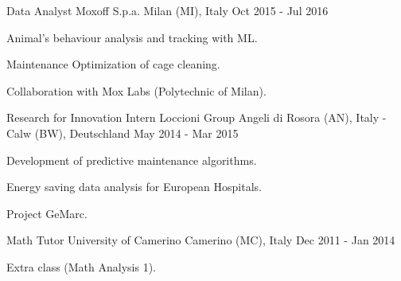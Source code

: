 \begin{cventries}
 \cventry
    {Data Analyst} %
    {Moxoff S.p.a.} %
    {Milan (MI), Italy} %
    {Oct 2015 - Jul 2016} %
    {
     \begin{cvitems} %
        \item {Animal's behaviour analysis and tracking with ML.}
        \item {Maintenance Optimization of cage cleaning.}
        \item {Collaboration with Mox Labs (Polytechnic of Milan).}
      \end{cvitems}
    }

  \cventry
    {Research for Innovation Intern} %
    {Loccioni Group} %
    {Angeli di Rosora (AN), Italy - Calw (BW), Deutschland} %
    {May 2014 - Mar 2015} %
    {
      \begin{cvitems} %
        \item {Development of predictive maintenance algorithms.}
        \item {Energy saving data analysis for European Hospitals.}
        \item {Project GeMarc.}
      \end{cvitems}
    }

  \cventry
    {Math Tutor} %
    {University of Camerino} %
    {Camerino (MC), Italy} %
    {Dec 2011 - Jan 2014} %
    {
      \begin{cvitems} %
        \item {Extra class (Math Analysis 1).}
       \end{cvitems}
    }

\end{cventries}
